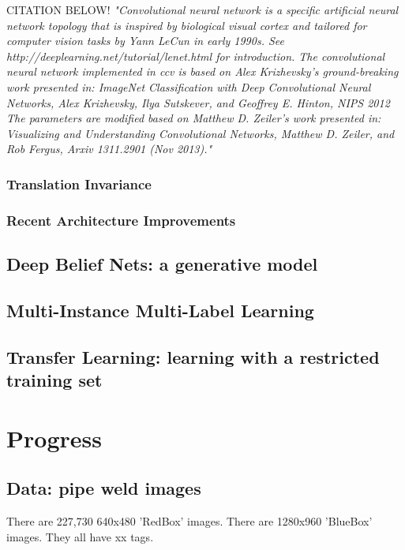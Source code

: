 \documentclass[a4paper,11pt]{article}
\begin{document}
CITATION BELOW!
\it{"Convolutional neural network is a specific artificial neural network topology that is inspired by biological visual cortex and tailored for computer vision tasks by Yann LeCun in early 1990s. See http://deeplearning.net/tutorial/lenet.html for introduction.
The convolutional neural network implemented in ccv is based on Alex Krizhevsky’s ground-breaking work presented in:
ImageNet Classification with Deep Convolutional Neural Networks, Alex Krizhevsky, Ilya Sutskever, and Geoffrey E. Hinton, NIPS 2012
The parameters are modified based on Matthew D. Zeiler’s work presented in:
Visualizing and Understanding Convolutional Networks, Matthew D. Zeiler, and Rob Fergus, Arxiv 1311.2901 (Nov 2013)."}

\subsubsection{Translation Invariance}

\subsubsection{Recent Architecture Improvements}

\pagebreak
\subsection{Deep Belief Nets: a generative model}


\subsection{Multi-Instance Multi-Label Learning}

\subsection{Transfer Learning: learning with a restricted training set}



\clearpage
\section{Progress}

\subsection{Data: pipe weld images}
There are 227,730 640x480 'RedBox' images. There are 1280x960 'BlueBox' images. They all have xx tags.
\end{document}
